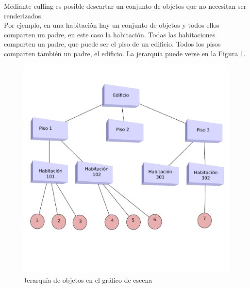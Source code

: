 \documentclass[a4paper,12pt,openany,oneside]{book}
\begin{document}
Mediante culling es posible descartar un conjunto de objetos que no necesitan ser renderizados. 
\\Por ejemplo, en una habitación hay un conjunto de objetos y todos ellos comparten un padre, en este caso la habitación. Todas las habitaciones comparten un padre, que puede ser el piso de un edificio. Todos los pisos comparten también un padre, el edificio. La jerarquía puede verse en la Figura \ref{culling1label}.
\begin{figure}[!hbp]
\begin{center}
\includegraphics[scale=0.7]{culling1.pdf}
\caption[Ejemplo Culling 1]{Jerarquía de objetos en el gráfico de escena}\label{culling1label}
\end{center}
\end{figure}
\end{document}
